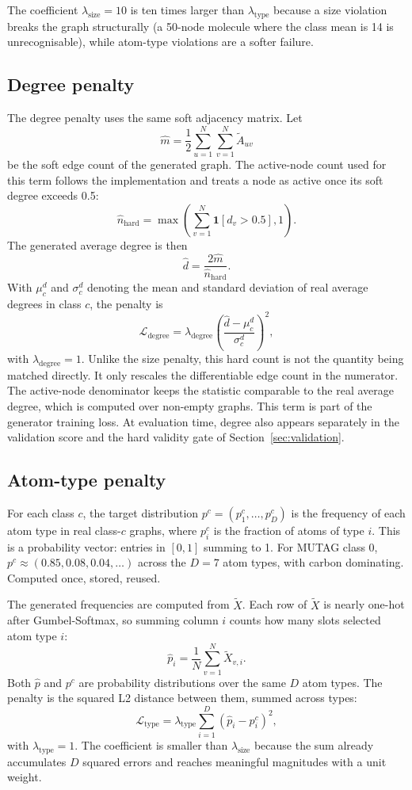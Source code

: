 \documentclass[12pt,a4paper]{article}
\begin{document}
The coefficient $\lambda_{\text{size}} = 10$ is ten times larger than $\lambda_{\text{type}}$ because a size violation breaks the graph structurally (a 50-node molecule where the class mean is 14 is unrecognisable), while atom-type violations are a softer failure.

\subsection{Degree penalty}

The degree penalty uses the same soft adjacency matrix. Let
\[
  \hat{m} = \frac{1}{2}\sum_{u=1}^{N}\sum_{v=1}^{N}\tilde{A}_{uv}
\]
be the soft edge count of the generated graph. The active-node count used for this term follows the implementation and treats a node as active once its soft degree exceeds 0.5:
\[
  \hat{n}_{\text{hard}} = \max\!\left(\sum_{v=1}^{N}\mathbf{1}[d_v > 0.5], 1\right).
\]
The generated average degree is then
\[
  \hat{d} = \frac{2\hat{m}}{\hat{n}_{\text{hard}}}.
\]
With $\mu^d_c$ and $\sigma^d_c$ denoting the mean and standard deviation of real average degrees in class $c$, the penalty is
\[
  \mathcal{L}_{\text{degree}} =
  \lambda_{\text{degree}}\left(\frac{\hat{d} - \mu^d_c}{\sigma^d_c}\right)^2,
\]
with $\lambda_{\text{degree}} = 1$. Unlike the size penalty, this hard count is not the quantity being matched directly. It only rescales the differentiable edge count in the numerator. The active-node denominator keeps the statistic comparable to the real average degree, which is computed over non-empty graphs. This term is part of the generator training loss. At evaluation time, degree also appears separately in the validation score and the hard validity gate of Section~\ref{sec:validation}.

\subsection{Atom-type penalty}

For each class $c$, the target distribution $p^c = (p_1^c, \ldots, p_D^c)$ is the frequency of each atom type in real class-$c$ graphs, where $p_i^c$ is the fraction of atoms of type $i$. This is a probability vector: entries in $[0, 1]$ summing to 1. For MUTAG class 0, $p^c \approx (0.85, 0.08, 0.04, \ldots)$ across the $D = 7$ atom types, with carbon dominating. Computed once, stored, reused.

The generated frequencies are computed from $\tilde{X}$. Each row of $\tilde{X}$ is nearly one-hot after Gumbel-Softmax, so summing column $i$ counts how many slots selected atom type $i$:
\[
  \hat{p}_i = \frac{1}{N} \sum_{v=1}^{N} \tilde{X}_{v, i}.
\]
Both $\hat{p}$ and $p^c$ are probability distributions over the same $D$ atom types. The penalty is the squared L2 distance between them, summed across types:
\[
  \mathcal{L}_{\text{type}} = \lambda_{\text{type}} \sum_{i=1}^{D} (\hat{p}_i - p_i^c)^2,
\]
with $\lambda_{\text{type}} = 1$. The coefficient is smaller than $\lambda_{\text{size}}$ because the sum already accumulates $D$ squared errors and reaches meaningful magnitudes with a unit weight.
\end{document}
